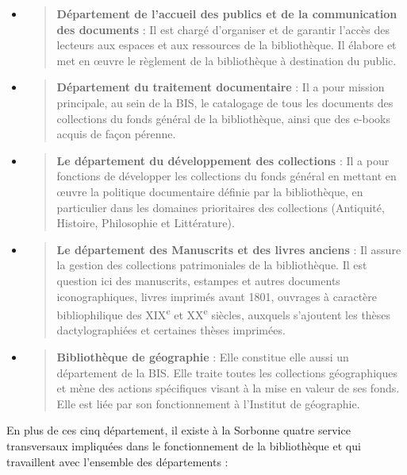 \documentclass[a4paper,12pt,twoside]{book}
\begin{document}
\begin{itemize}
	\item
	\begin{quote}
		\textbf{Département de l'accueil des publics et de la communication des documents} : Il est chargé d’organiser et de garantir l’accès des lecteurs aux espaces et aux ressources de la bibliothèque. Il élabore et met en œuvre le règlement de la bibliothèque à destination du public.
	\end{quote}
	\item
	\begin{quote}
		\textbf{Département du traitement documentaire
		} :
		Il a pour mission principale, au sein de la BIS, le catalogage de tous les documents des collections du fonds général de la bibliothèque, ainsi que des e-books acquis de façon pérenne.
	\end{quote}
	\item
	\begin{quote}
		\textbf{Le département du développement des collections
		} :
		Il a pour fonctions de développer les collections du fonds général en mettant en œuvre la politique documentaire définie par la bibliothèque, en particulier dans les domaines prioritaires des collections (Antiquité, Histoire, Philosophie et Littérature).
	\end{quote}
	\item
	\begin{quote}
		\textbf{Le département des Manuscrits et des livres anciens} : Il assure la gestion des collections patrimoniales de la bibliothèque. Il est question ici des manuscrits, estampes et autres documents iconographiques, livres imprimés avant 1801, ouvrages à caractère bibliophilique des XIX\textsuperscript{e} et XX\textsuperscript{e} siècles, auxquels s’ajoutent les thèses dactylographiées et certaines thèses imprimées.
	\end{quote}
	\item
	\begin{quote}
		\textbf{Bibliothèque de géographie
		} : Elle constitue elle aussi un département de la BIS. Elle traite toutes les collections géographiques et mène des actions spécifiques visant à la mise en valeur de ses fonds. Elle est liée par son fonctionnement à l’Institut de géographie. \\
	\end{quote}
\end{itemize} 

En plus de ces cinq département, il existe à la Sorbonne quatre service transversaux impliquées dans le fonctionnement de la bibliothèque et qui travaillent avec l'ensemble des départements : \\
\end{document}
